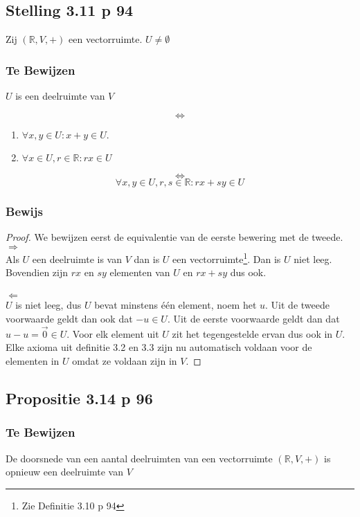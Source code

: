 \documentclass[lineaire_algebra_oplossingen.tex]{subfiles}
\begin{document}
\subsection{Stelling 3.11 p 94}
Zij $(\mathbb{R},V,+)$ een vectorruimte. $U \neq \emptyset$
\subsubsection*{Te Bewijzen}
\begin{center}
$U$ is een deelruimte van $V$
\end{center}
\[
\Leftrightarrow
\] 
\begin{enumerate}
\item $\forall x,y\in U: x+y\in U$.
\item $\forall x\in U, r\in \mathbb{R}: rx \in U$
\end{enumerate}
\[
\Leftrightarrow
\]
\[
\forall x,y\in U, r,s\in \mathbb{R}: rx+sy\in U
\]
\subsubsection*{Bewijs}
\begin{proof}
We bewijzen eerst de equivalentie van de eerste bewering met de tweede.\\
\emph{$\Rightarrow$}\\
Als $U$ een deelruimte is van $V$ dan is $U$ een vectorruimte\footnote{Zie Definitie 3.10 p 94}. Dan is $U$ niet leeg. Bovendien zijn $rx$ en $sy$ elementen van $U$ en $rx+sy$ dus ook.\\\\
\emph{$\Leftarrow$}\\
$U$ is niet leeg, dus $U$ bevat minstens \'e\'en element, noem het $u$. Uit de tweede voorwaarde geldt dan ook dat $-u \in U$. Uit de eerste voorwaarde geldt dan dat $u-u = \vec{0} \in U$. Voor elk element uit $U$ zit het tegengestelde ervan dus ook in $U$. Elke axioma uit definitie 3.2 en 3.3 zijn nu automatisch voldaan voor de elementen in $U$ omdat ze voldaan zijn in $V$.
\end{proof}

\subsection{Propositie 3.14 p 96}
\subsubsection*{Te Bewijzen}
De doorsnede van een aantal deelruimten van een vectorruimte $(\mathbb{R},V,+)$ is opnieuw een deelruimte van $V$
\end{document}

